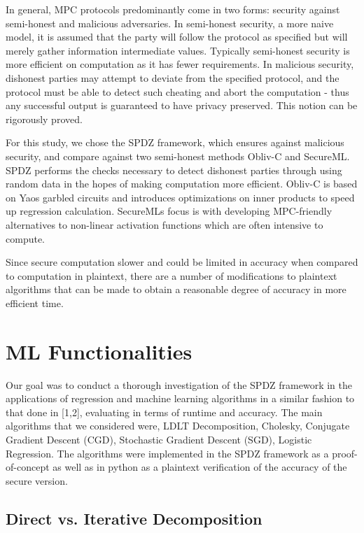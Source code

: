 \documentclass{article}
\begin{document}
In general, MPC protocols predominantly come in two forms: security against semi-honest and malicious adversaries. In semi-honest security, a more naive model, it is assumed that the party will follow the protocol as specified but will merely gather information intermediate values. Typically semi-honest security is more efficient on computation as it has fewer requirements. In malicious security, dishonest parties may attempt to deviate from the specified protocol, and the protocol must be able to detect such cheating and abort the computation - thus any successful output is guaranteed to have privacy preserved. This notion can be rigorously proved. 

For this study, we chose the SPDZ framework, which ensures against malicious security, and compare against two semi-honest methods Obliv-C and SecureML. SPDZ performs the checks necessary to detect dishonest parties through using random data in the hopes of making computation more efficient. Obliv-C is based on Yao\textquotesingle s garbled circuits and introduces optimizations on inner products to speed up regression calculation. SecureML\textquotesingle s focus is with developing MPC-friendly alternatives to non-linear activation functions which are often intensive to compute. 

Since secure computation slower and could be limited in accuracy when compared to computation in plaintext, there are a number of modifications to plaintext algorithms that can be made to obtain a reasonable degree of accuracy in more efficient time.

\section{ML Functionalities}

Our goal was to conduct a thorough investigation of the SPDZ framework in the applications of regression and machine learning algorithms in a similar fashion to that done in  [1,2], evaluating in terms of runtime and accuracy. The main algorithms that we considered were, LDLT Decomposition, Cholesky, Conjugate Gradient Descent (CGD), Stochastic Gradient Descent (SGD), Logistic Regression. The algorithms were implemented in the SPDZ framework as a proof-of-concept as well as in python as a plaintext verification of the accuracy of the secure version.

\subsection{Direct vs. Iterative Decomposition}
\end{document}
